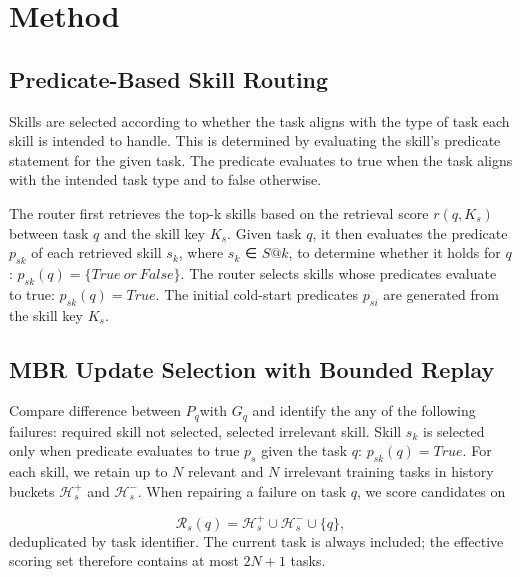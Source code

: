 
\section{Method}

\subsection{Predicate-Based Skill Routing}

Skills are selected according to whether the task aligns with the type of task each skill is intended to handle. This is determined by evaluating the skill's predicate statement for the given task. The predicate evaluates to true when the task aligns with the intended task type and to false otherwise.

The router first retrieves the top-k skills based on the retrieval score \(r(q,K_{s})\) between task \(q\) and the skill key \(K_{s}\). Given task \(q\), it then evaluates the predicate \(p_{sk}\) of each retrieved skill \(s_{k}\), where \(s_{k}\) ∈ \(S@k\), to determine whether it holds for \(q\): \(p_{sk}(q) = \{ True\ or\ False\}\). The router selects skills whose predicates evaluate to true: \(p_{sk}(q) = True\). The initial cold-start predicates \(p_{si}\) are generated from the skill key \(K_{s}\).

\subsection{MBR Update Selection with Bounded Replay}

Compare difference between \(P_{q}\)with \(G_{q}\) and identify the any of the following failures: required skill not selected, selected irrelevant skill. Skill \(s_{k}\) is selected only when predicate evaluates to true \(p_{s}\) given the task \(q\): \(p_{sk}(q) = True\). For each skill, we retain up to \(N\) relevant and \(N\) irrelevant training tasks in history buckets \(\mathcal H_s^+\) and \(\mathcal H_s^-\). When repairing a failure on task \(q\), we score candidates on

\[\mathcal R_s(q)=\mathcal H_s^+\cup\mathcal H_s^-\cup\{q\},\]
deduplicated by task identifier. The current task is always included; the effective scoring set therefore contains at most \(2N+1\) tasks.

